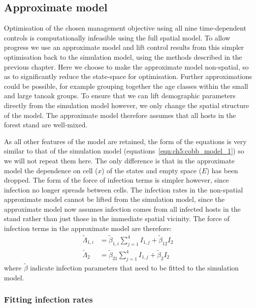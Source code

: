 \subsection{Approximate model}

Optimisation of the chosen management objective using all nine time-dependent controls is computationally infeasible using the full spatial model. To allow progress we use an approximate model and lift control results from this simpler optimisation back to the simulation model, using the methods described in the previous chapter. Here we choose to make the approximate model non-spatial, so as to significantly reduce the state-space for optimisation. Further approximations could be possible, for example grouping together the age classes within the small and large tanoak groups. To ensure that we can lift demographic parameters directly from the simulation model however, we only change the spatial structure of the model. The approximate model therefore assumes that all hosts in the forest stand are well-mixed.

As all other features of the model are retained, the form of the equations is very similar to that of the simulation model (equations~\ref{eqn:ch5:cobb_model_1}) so we will not repeat them here. The only difference is that in the approximate model the dependence on cell ($x$) of the states and empty space ($E$) has been dropped. The form of the force of infection terms is simpler however, since infection no longer spreads between cells. The infection rates in the non-spatial approximate model cannot be lifted from the simulation model, since the approximate model now assumes infection comes from all infected hosts in the stand rather than just those in the immediate spatial vicinity. The force of infection terms in the approximate model are therefore:
\begin{subequations}\label{eqn:ch6:infection_approx}
        \begin{align}
            \tilde{\Lambda}_{1,i} &= \tilde{\beta}_{1,i}\sum_{j=1}^4I_{1,j} + \tilde{\beta}_{12}I_{2} \\
            \tilde{\Lambda}_{2} &= \tilde{\beta}_{21}\sum_{j=1}^4I_{1,j} + \tilde{\beta}_{2}I_{2}
        \end{align}
\end{subequations}
where $\tilde{\beta}$ indicate infection parameters that need to be fitted to the simulation model.

\subsubsection{Fitting infection rates}

